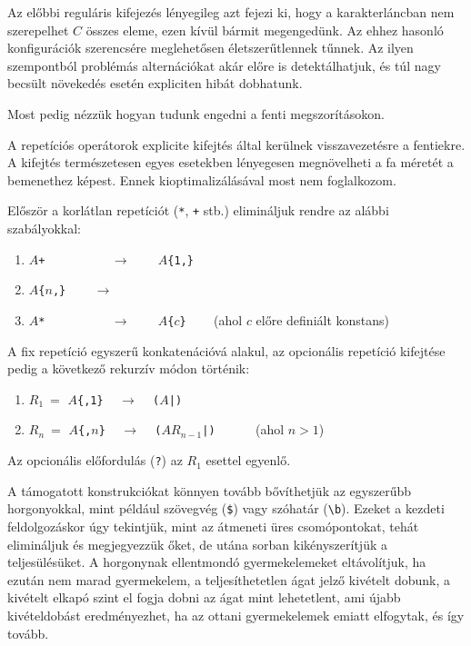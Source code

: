 \documentclass[
    parspace,
    noindent,
    nohyp,
]{elteiktdk}[2023/04/10]
\newcommand{\regextt}[1]{\texttt{\colorbox{verylightgray}{#1}}}
\begin{document}
Az előbbi reguláris kifejezés lényegileg azt fejezi ki,
hogy a karakterláncban nem szerepelhet $C$ összes eleme, ezen kívül bármit megengedünk.
Az ehhez hasonló konfigurációk szerencsére meglehetősen életszerűtlennek tűnnek.
Az ilyen szempontból problémás alternációkat akár előre is detektálhatjuk,
és túl nagy becsült növekedés esetén expliciten hibát dobhatunk.

Most pedig nézzük hogyan tudunk engedni a fenti megszorításokon.

A repetíciós operátorok explicite kifejtés által kerülnek visszavezetésre a fentiekre.
A kifejtés természetesen egyes esetekben lényegesen megnövelheti a fa méretét a bemenethez képest.
Ennek kioptimalizálásával most nem foglalkozom.

Először a korlátlan repetíciót (\regextt{*}, \regextt{+} stb.) elimináljuk rendre az alábbi szabályokkal:

\begin{enumerate}
    \item \texttt{$A$+} ~~~~~~~~~ $\longrightarrow$ ~~~ \texttt{$A$\{1,\}}
    \item \texttt{$A$\{$n$,\}} ~~~ $\longrightarrow$ ~~~ 
    \item \texttt{$A$*} ~~~~~~~~~ $\longrightarrow$ ~~~ \texttt{$A$\{$c$\}} ~~~ (ahol $c$ előre definiált konstans)
\end{enumerate}

A fix repetíció egyszerű konkatenációvá alakul,
az opcionális repetíció kifejtése pedig a következő rekurzív módon történik:

\begin{enumerate}
    \item $R_1~=$ \texttt{$A$\{,1\}} ~ $\longrightarrow$ ~ \texttt{($A$|)}
    \item $R_n~=$ \texttt{$A$\{,$n$\}} ~ $\longrightarrow$ ~ \texttt{($AR_{n-1}$|)} ~~~~~ (ahol $n>1$)
\end{enumerate}

Az opcionális előfordulás (\regextt{?}) az $R_1$ esettel egyenlő.

A támogatott konstrukciókat könnyen tovább bővíthetjük az egyszerűbb horgonyokkal,
mint például szövegvég (\regextt{\$}) vagy szóhatár (\regextt{{\textbackslash}b}).
Ezeket a kezdeti feldolgozáskor úgy tekintjük,
mint az átmeneti üres csomópontokat, tehát elimináljuk és megjegyezzük őket,
de utána sorban kikényszerítjük a teljesülésüket.
A horgonynak ellentmondó gyermekelemeket eltávolítjuk,
ha ezután nem marad gyermekelem, a teljesíthetetlen ágat jelző kivételt dobunk,
a kivételt elkapó szint el fogja dobni az ágat mint lehetetlent,
ami újabb kivételdobást eredményezhet, ha az ottani gyermekelemek emiatt elfogytak,
és így tovább.
\end{document}

